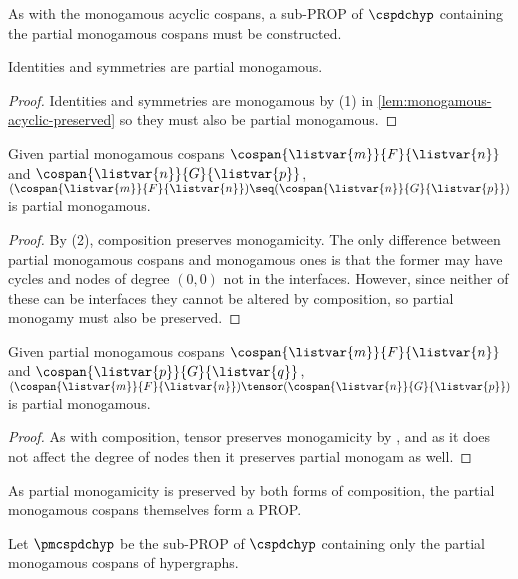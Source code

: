 As with the monogamous acyclic cospans, a sub-PROP of \(\cspdchyp\) containing
the partial monogamous cospans must be constructed.

\begin{lemma}
    Identities and symmetries are partial monogamous.
\end{lemma}
\begin{proof}
    Identities and symmetries are monogamous by (1) in
    \cref{lem:monogamous-acyclic-preserved} so they must also be partial
    monogamous.
\end{proof}

\begin{lemma}
    Given partial monogamous cospans \(\cospan{\listvar{m}}{F}{\listvar{n}}\)
    and \(\cospan{\listvar{n}}{G}{\listvar{p}}\), \(
        (\cospan{\listvar{m}}{F}{\listvar{n}})
        \seq
        (\cospan{\listvar{n}}{G}{\listvar{p}})
    \) is partial monogamous.
\end{lemma}
\begin{proof}
    By (2), composition preserves monogamicity.
    The only difference between partial monogamous cospans and monogamous ones
    is that the former may have cycles and nodes of degree \((0,0)\) not in the
    interfaces.
    However, since neither of these can be interfaces they cannot be altered by
    composition, so partial monogamy must also be preserved.
\end{proof}

\begin{lemma}
    Given partial monogamous cospans \(\cospan{\listvar{m}}{F}{\listvar{n}}\)
    and \(\cospan{\listvar{p}}{G}{\listvar{q}}\), \(
        (\cospan{\listvar{m}}{F}{\listvar{n}})
        \tensor
        (\cospan{\listvar{n}}{G}{\listvar{p}})
    \) is partial monogamous.
\end{lemma}
\begin{proof}
    As with composition, tensor preserves monogamicity by
    \cite[Lem. 17]{bonchi2022stringa}, and as it does not affect the degree of
    nodes then it preserves partial monogam as well.
\end{proof}

As partial monogamicity is preserved by both forms of composition, the
partial monogamous cospans themselves form a PROP.

\begin{definition}
    Let \(\pmcspdchyp\) be the sub-PROP of \(\cspdchyp\) containing only the
    partial monogamous cospans of hypergraphs.
\end{definition}

